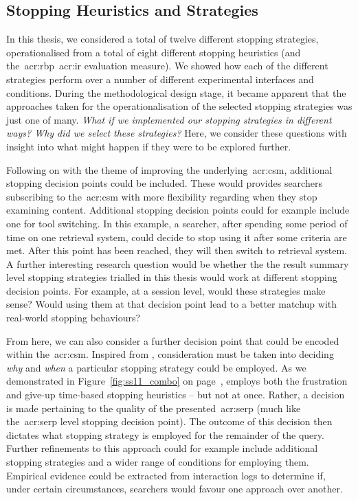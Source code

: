 \subsection{Stopping Heuristics and Strategies}\label{sec:conclusions:future:stopping}
In this thesis, we considered a total of twelve different stopping strategies, operationalised from a total of eight different stopping heuristics (and the~\gls{acr:rbp}~\gls{acr:ir} evaluation measure). We showed how each of the different strategies perform over a number of different experimental interfaces and conditions. During the methodological design stage, it became apparent that the approaches taken for the operationalisation of the selected stopping strategies was just one of many. \emph{What if we implemented our stopping strategies in different ways? Why did we select these strategies?} Here, we consider these questions with insight into what might happen if they were to be explored further.

Following on with the theme of improving the underlying~\gls{acr:csm}, additional stopping decision points could be included. These would provides searchers subscribing to the~\gls{acr:csm} with more flexibility regarding when they stop examining content. Additional stopping decision points could for example include one for tool switching. In this example, a searcher, after spending some period of time on one retrieval system, could decide to stop using it after some criteria are met. After this point has been reached, they will then switch to retrieval system. A further interesting research question would be whether the the result summary level stopping strategies trialled in this thesis would work at different stopping decision points. For example, at a session level, would these strategies make sense? Would using them at that decision point lead to a better matchup with real-world stopping behaviours?

From here, we can also consider a further decision point that could be encoded within the~\gls{acr:csm}. Inspired from , consideration must be taken into deciding \emph{why} and \emph{when} a particular stopping strategy could be employed. As we demonstrated in Figure~\ref{fig:ss11_combo} on page~\pageref{fig:ss11_combo},  employs both the frustration and give-up time-based stopping heuristics -- but not at once. Rather, a decision is made pertaining to the quality of the presented~\gls{acr:serp} (much like the~\gls{acr:serp} level stopping decision point). The outcome of this decision then dictates what stopping strategy is employed for the remainder of the query. Further refinements to this approach could for example include additional stopping strategies and a wider range of conditions for employing them. Empirical evidence could be extracted from interaction logs to determine if, under certain circumstances, searchers would favour one approach over another.

